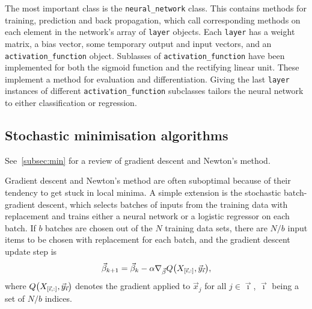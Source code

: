 \documentclass[11pt,british,a4paper]{article}
\numberwithin{equation}{section}
\begin{document}
The most important class is the \lstinline{neural_network} class. This contains methods for training, prediction and back propagation, which call corresponding methods on each element in the network's array of \lstinline{layer} objects. Each \lstinline{layer} has a weight matrix, a bias vector, some temporary output and input vectors, and an \lstinline{activation_function} object. Sublasses of \lstinline{activation_function} have been implemented for both the sigmoid function and the rectifying linear unit. These implement a method for evaluation and differentiation. Giving the last \lstinline{layer} instances of different \lstinline{activation_function} subclasses tailors the neural network to either classification or regression.



\subsection{Stochastic minimisation algorithms}
See~\vref{subsec:min} for a review of gradient descent and Newton's method.

Gradient descent and Newton's method are often suboptimal because of their tendency to get stuck in local minima.
A simple extension is the stochastic batch-gradient descent, which selects batches of inputs from the training data with replacement and trains either a neural network or a logistic regressor on each batch. If \(b\) batches are chosen out of the \(N\) training data sets, there are \(N/b\) input items to be chosen with replacement for each batch, and the gradient descent update step is
\begin{equation}
    \vec{\beta}_{k+1} = \vec{\beta}_k - \alpha \nabla_{\vec{\beta}} Q\qty(X_{\qty[\vec{\imath},:]},\vec{y}_{\vec{\imath}}),
\end{equation}
where \(Q\qty(X_{\qty[\vec{\imath},:]},\vec{y}_{\vec{\imath}})\) denotes the gradient applied to \(\vec{x}_j\) for all \(j\in\vec{\imath}\), \(\vec{\imath}\) being a set of \(N/b\) indices.
\end{document}
